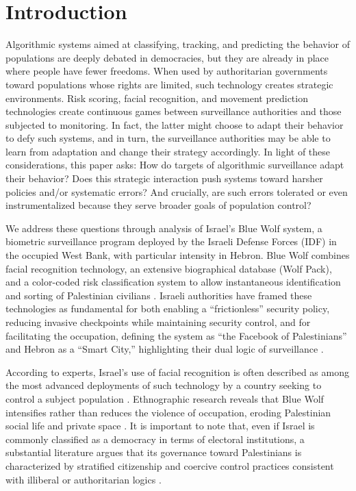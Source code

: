 \documentclass[11pt,a4paper]{article}
\theoremstyle{definition}
\theoremstyle{remark}
\theoremstyle{definition}
\begin{document}
\section{Introduction}
Algorithmic systems aimed at classifying, tracking, and predicting the behavior of populations are deeply debated in democracies, but they are already 
in place where people have fewer freedoms. When used by authoritarian governments toward populations whose rights are limited,
such technology creates strategic environments. Risk scoring, facial recognition, and movement prediction technologies create continuous games 
between surveillance authorities and those subjected to monitoring. In fact, the latter might choose to adapt their behavior to defy such 
systems, and in turn, the surveillance authorities may be able to learn from adaptation and change their strategy accordingly. 
In light of these considerations, this paper asks: How do targets of algorithmic surveillance adapt their behavior? Does this strategic interaction 
push systems toward harsher policies and/or systematic errors? And crucially, are such errors tolerated or even instrumentalized because they serve 
broader goals of population control?  

We address these questions through analysis of Israel's Blue Wolf system, a biometric surveillance program deployed by the 
Israeli Defense Forces (IDF) in the occupied West Bank, with particular intensity in Hebron. Blue Wolf combines facial recognition technology, 
an extensive biographical database (Wolf Pack), and a color-coded risk classification system to allow instantaneous identification and sorting 
of Palestinian civilians \citep{dwoskin2021israel, amnesty2023automated}. Israeli authorities have framed these technologies as fundamental for 
both enabling a ``frictionless'' security policy, reducing invasive checkpoints while maintaining security control, and for facilitating the 
occupation, defining the system as ``the Facebook of Palestinians'' and Hebron as a ``Smart City,'' highlighting their dual logic of 
surveillance \citep{dwoskin2021israel}. 

According to experts, Israel's use of facial recognition is often described as among the most advanced 
deployments of such technology by a country seeking to control a subject population \citep{fatafta2017surveillance}. Ethnographic research reveals 
that Blue Wolf intensifies rather than reduces the violence of occupation, eroding Palestinian social life and private space 
\citep{goodfriend2023algorithmic}. It is important to note that, even if Israel is commonly classified as a democracy in terms of electoral 
institutions, a substantial literature argues that its governance toward Palestinians is characterized by stratified citizenship and coercive 
control practices consistent with illiberal or authoritarian logics 
\citep{dayan2022dualstate,gidron2023crisis,jamal2007hollow,smooha2002ethnic,rouhana1997identities,peled2008evolution}.
\end{document}
